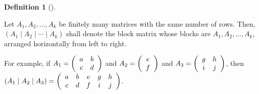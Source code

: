 \documentclass[numbers=enddot,12pt,final,onecolumn,notitlepage]{scrartcl}%
\theoremstyle{definition}
\newtheorem{defi}[theo]{Definition}
\newenvironment{definition}[1][]
{\begin{defi}[#1]\begin{leftbar}}
{\end{leftbar}\end{defi}}
\theoremstyle{plainsl}
\begin{document}

\begin{definition}
Let $A_{1},A_{2},\ldots,A_{k}$ be finitely many matrices with the same number
of rows. Then, $\left(  A_{1}\mid A_{2}\mid\cdots\mid A_{k}\right)  $ shall
denote the block matrix whose blocks are $A_{1},A_{2},\ldots,A_{k}$, arranged
horizontally from left to right.
\end{definition}

For example, if $A_{1}=\left(
\begin{array}
[c]{cc}%
a & b\\
c & d
\end{array}
\right)  $ and $A_{2}=\left(
\begin{array}
[c]{c}%
e\\
f
\end{array}
\right)  $ and $A_{3}=\left(
\begin{array}
[c]{cc}%
g & h\\
i & j
\end{array}
\right)  $, then $\left(  A_{1}\mid A_{2}\mid A_{3}\right)  =\left(
\begin{array}
[c]{ccccc}%
a & b & e & g & h\\
c & d & f & i & j
\end{array}
\right)  $.
\end{document}
